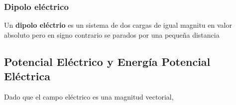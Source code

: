 \def\R{1.8}
\def\NE{8}
\def\NV{4}
\begin{center}
    \begin{minipage}{0.45\textwidth}
      \centering %
    \end{minipage}
    \hfill %
    \begin{minipage}{0.45\textwidth}
      \centering
    \end{minipage}
  \end{center}
  
\subsubsection{Dipolo eléctrico}
Un \textbf{dipolo eléctrio} es un sistema de dos cargas de igual magnitu en valor absoluto pero en signo contrario se parados por una pequeña distancia
\subsection{Potencial Eléctrico y Energía Potencial Eléctrica}
Dado que el campo eléctrico es una magnitud vectorial, 


